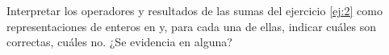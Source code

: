 \begin{enunciado}{\ejercicio}
  Interpretar los operadores y resultados de las sumas del ejercicio \ref{ej:2} como representaciones de enteros
  en \compDos y, para cada una de ellas, indicar cuáles son correctas, cuáles no. ¿Se evidencia \overflow en alguna?
\end{enunciado}
\hacer
